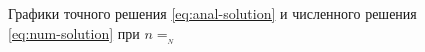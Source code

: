 \begin{figure}[htb]
  \centering
  \caption{Графики точного решения \eqref{eq:anal-solution} и
    численного решения \eqref{eq:num-solution} при $n=__N$}
  \label{fig:numeric-plot}
\end{figure}
